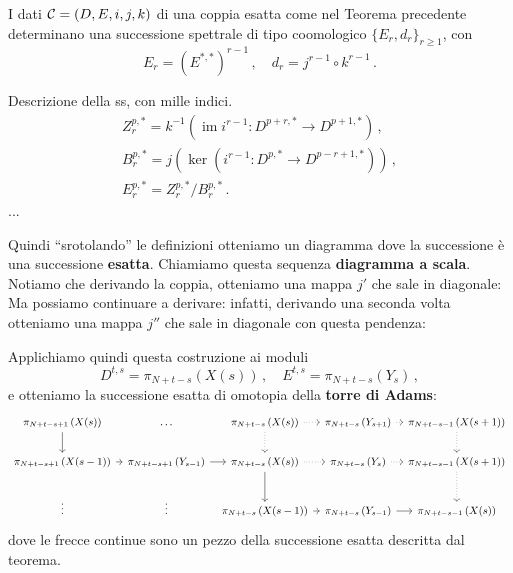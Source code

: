 \begin{thm}
	I dati $\mathcal{C} = (D,E,i,j,k)$ di una coppia esatta come nel Teorema
	precedente determinano una successione spettrale di tipo coomologico
	$\{E_{r}, d_{r}\}_{r \ge 1}$, con
	\begin{equation*}
		E_{r} = \left( E^{*,*} \right)^{r-1}\,, \quad
		d_{r} = j^{r-1} \circ k^{r-1}\,.
	\end{equation*}
\end{thm}

\begin{prop}
	Descrizione della ss, con mille indici.
	\begin{align*}
		Z_{r}^{p,*} = k^{-1}\left( \operatorname{im} i^{r-1} : D^{p+r,*} \longrightarrow D^{p+1, *} \right)\,, \\
		B^{p,*}_{r} = j \left( \ker \left( i^{r-1} : D^{p,*} \longrightarrow D^{p-r+1,*} \right) \right)\,, \\
		E^{p,*}_{r} = Z^{p,*}_{r}/B^{p,*}_{r}\,.
	\end{align*}
	...
\end{prop}

Quindi ``srotolando'' le definizioni otteniamo un diagramma
dove la successione
è una successione \textbf{esatta}. Chiamiamo questa
sequenza \textbf{diagramma a scala}.
Notiamo che derivando la coppia,
otteniamo una mappa $j'$ che sale in diagonale:
Ma possiamo continuare a derivare:
infatti, derivando una seconda volta otteniamo una
mappa $j''$ che sale in diagonale con questa pendenza:

Applichiamo quindi questa costruzione ai moduli
\begin{equation*}
	D^{t,s} = \pi_{N+t-s}\left( X(s) \right)\,,
	\quad E^{t,s} = \pi_{N+t-s}\left(Y_{s} \right)\,,
\end{equation*}
e otteniamo la successione esatta di omotopia
della \textbf{torre di Adams}: 
\begin{equation*}
	\begin{tikzcd}[column sep=tiny, font=\small]
		\pi_{N+t-s+1}\left( X(s) \right) 	\ar[d]
		& \dots	
		& \pi_{N+t-s}\left( X(s) \right) \ar[r, dotted] \ar[d, dotted]
		& \pi_{N+t-s}\left( Y_{s+1} \right) \ar[r, dotted]
		& \pi_{N+t-s-1}\left( X(s+1) \right)  \ar[d, dotted] \\
		\pi_{N+t-s+1}\left( X(s-1) \right) \ar[r]
		& \pi_{N+t-s+1}\left( Y_{s-1} \right) 	\ar[r]
		& \pi_{N+t-s}\left( X(s) \right) \ar[r, dotted] \ar[d]
		& \pi_{N+t-s}\left( Y_{s} \right) \ar[r, dotted]
		& \pi_{N+t-s-1}\left( X(s+1) \right)  \ar[d, dotted] \\
		\vdots & \vdots
		& \pi_{N+t-s}\left( X(s-1) \right) \ar[r] 
		& \pi_{N+t-s}\left( Y_{s-1} \right) \ar[r]
		& \pi_{N+t-s-1}\left( X(s) \right) 
	\end{tikzcd}
\end{equation*}
dove le frecce continue sono un pezzo della successione esatta
descritta dal teorema.

